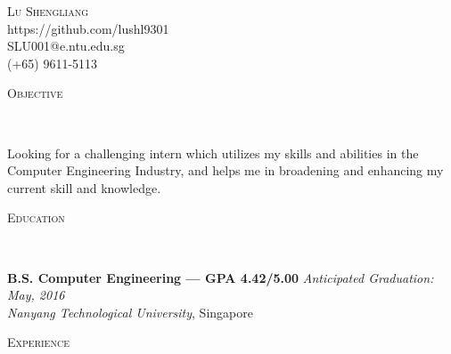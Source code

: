 \documentclass[9pt]{article}
\newenvironment{changemargin}[2]{%
  \begin{list}{}{%
      \setlength{\topsep}{0pt}%
      \setlength{\leftmargin}{#1}%
      \setlength{\rightmargin}{#2}%
      \setlength{\listparindent}{\parindent}%
      \setlength{\itemindent}{\parindent}%
      \setlength{\parsep}{\parskip}%
    }%
  \item[]}{\end{list}
}
\newcommand{\lineover}{
  \begin{changemargin}{-0.05in}{-0.05in}
    \vspace*{-8pt}
    \hrulefill \\
    \vspace*{-2pt}
  \end{changemargin}
}
\newcommand{\header}[1]{
  \begin{changemargin}{-0.5in}{-0.5in}
    \scshape{#1}\\
    \lineover
  \end{changemargin}
}
\newcommand{\contact}[4]{
  \begin{changemargin}{-0.5in}{-0.5in}
    \begin{center}
      {\Large \scshape {#1}}\\ \smallskip
      {#2}\\ \smallskip 
      {#3}\\ \smallskip
      {#4}\smallskip
    \end{center}
  \end{changemargin}
}
\newenvironment{body}
{
\vspace*{-16pt}
\begin{changemargin}{-0.25in}{-0.5in}
}	
{
\end{changemargin}
}
\begin{document}
\contact{Lu Shengliang}{https://github.com/lushl9301}{SLU001@e.ntu.edu.sg}{(+65) 9611-5113}


\header{Objective}

\begin{body}
  \vspace{14pt}
Looking for a challenging intern which utilizes my skills and abilities in the Computer Engineering Industry, and helps me in broadening and enhancing my current skill and knowledge.
\end{body}

\smallskip


\header{Education}

\begin{body}
  \vspace{14pt}
  \textbf{B.S. Computer Engineering --- GPA 4.42/5.00} \hfill \emph{Anticipated Graduation: May, 2016} \\
  \emph{Nanyang Technological University}, Singapore\\
\end{body}

\smallskip


\header{Experience}
\end{document}
